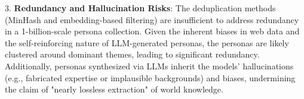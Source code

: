 3. \textbf{Redundancy and Hallucination Risks}: The deduplication methods (MinHash and embedding-based filtering) are insufficient to address redundancy in a 1-billion-scale persona collection. Given the inherent biases in web data and the self-reinforcing nature of LLM-generated personas, the personas are likely clustered around dominant themes, leading to significant redundancy. Additionally, personas synthesized via LLMs inherit the models’ hallucinations (e.g., fabricated expertise or implausible backgrounds) and biases, undermining the claim of "nearly lossless extraction" of world knowledge.